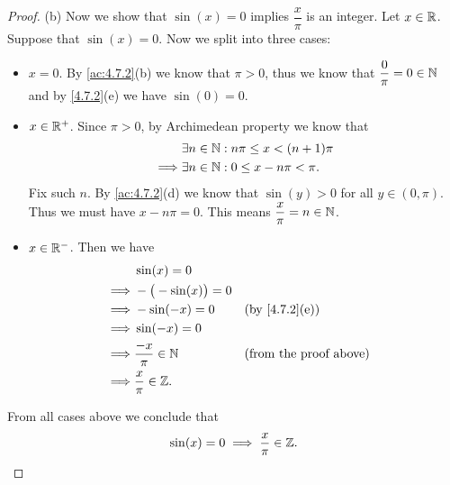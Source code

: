 \begin{proof}{(b)}
  Now we show that \(\sin(x) = 0\) implies \(\dfrac{x}{\pi}\) is an integer.
  Let \(x \in \mathbb{R}\).
  Suppose that \(\sin(x) = 0\).
  Now we split into three cases:
  \begin{itemize}
    \item \(x = 0\).
          By \cref{ac:4.7.2}(b) we know that \(\pi > 0\), thus we know that \(\dfrac{0}{\pi} = 0 \in \mathbb{N}\) and by \cref{4.7.2}(e) we have \(\sin(0) = 0\).
    \item \(x \in \mathbb{R}^+\).
          Since \(\pi > 0\), by Archimedean property we know that
          \begin{align*}
                     & \exists n \in \mathbb{N} : n \pi \leq x < (n + 1) \pi \\
            \implies & \exists n \in \mathbb{N} : 0 \leq x - n \pi < \pi.
          \end{align*}
          Fix such \(n\).
          By \cref{ac:4.7.2}(d) we know that \(\sin(y) > 0\) for all \(y \in (0, \pi)\).
          Thus we must have \(x - n \pi = 0\).
          This means \(\dfrac{x}{\pi} = n \in \mathbb{N}\).
    \item \(x \in \mathbb{R}^-\).
          Then we have
          \begin{align*}
                     & \sin(x) = 0                                                \\
            \implies & -\big(-\sin(x)\big) = 0                                    \\
            \implies & -\sin(-x) = 0           &  & \text{(by \cref{4.7.2}(e))}   \\
            \implies & \sin(-x) = 0                                               \\
            \implies & \dfrac{-x}{\pi} \in \N  &  & \text{(from the proof above)} \\
            \implies & \dfrac{x}{\pi} \in \Z.
          \end{align*}
  \end{itemize}
  From all cases above we conclude that
  \[
    \sin(x) = 0 \implies \dfrac{x}{\pi} \in \mathbb{Z}.
  \]
\end{proof}

